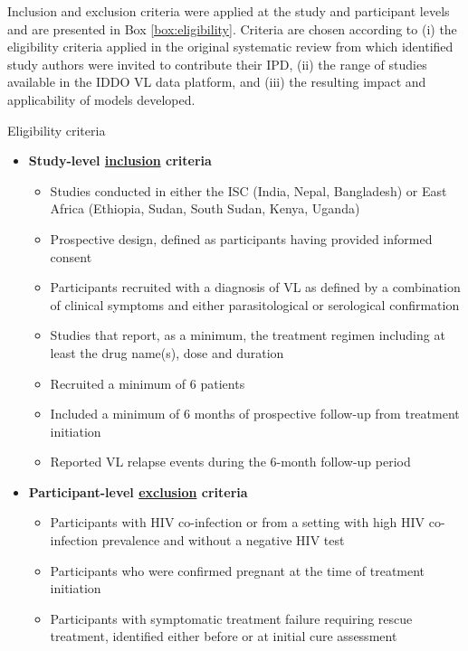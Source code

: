 Inclusion and exclusion criteria were applied at the study and participant levels and are presented in Box \ref{box:eligibility}. Criteria are chosen according to (i) the eligibility criteria applied in the original systematic review from which identified study authors were invited to contribute their IPD\cite{bush2017}, (ii) the range of studies available in the IDDO VL data platform, and (iii) the resulting impact and applicability of models developed.

\begin{mybox}[floatplacement=tb, label=box:eligibility]{Eligibility criteria}
  \begin{itemize}[nosep]
    \item \textbf{Study-level \underline{inclusion} criteria}
          \begin{itemize}
            \item Studies conducted in either the ISC (India, Nepal, Bangladesh) or East Africa (Ethiopia, Sudan, South Sudan, Kenya, Uganda)
            \item Prospective design, defined as participants having provided informed consent
            \item Participants recruited with a diagnosis of VL as defined by a combination of clinical symptoms and either parasitological or serological confirmation
            \item Studies that report, as a minimum, the treatment regimen including at least the drug name(s), dose and duration
            \item Recruited a minimum of 6 patients
            \item Included a minimum of 6 months of prospective follow-up from treatment initiation
            \item Reported VL relapse events during the 6-month follow-up period
          \end{itemize}
    \item \textbf{Participant-level \underline{exclusion} criteria}
          \begin{itemize}
            \item Participants with HIV co-infection or from a setting with high HIV co-infection prevalence and without a negative HIV test
            \item Participants who were confirmed pregnant at the time of treatment initiation
            \item Participants with symptomatic treatment failure requiring rescue treatment, identified either before or at initial cure assessment
          \end{itemize}
  \end{itemize}
\end{mybox}

